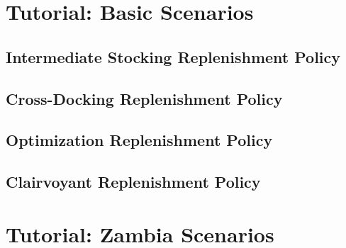 \documentclass[12pt,oneside]{memoir}
\begin{document}
\chapter{Tutorial: Basic Scenarios}

\section{Intermediate Stocking Replenishment Policy}

\section{Cross-Docking Replenishment Policy}

\section{Optimization Replenishment Policy}

\section{Clairvoyant Replenishment Policy}



\chapter{Tutorial: Zambia Scenarios}







\end{document}
